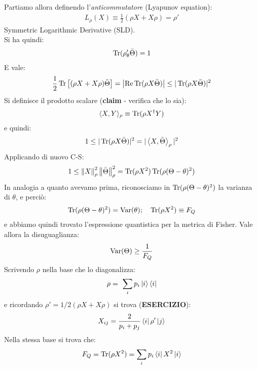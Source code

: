 \documentclass[../../InformazioneQuantistica.tex]{subfiles}
\begin{document}
Partiamo allora definendo l'\textit{anticommutatore} (Lyapunov equation):
\begin{align*}
L_\rho(X) \equiv \frac{1}{2}(\rho X + X\rho) = \rho'
\end{align*}
Symmetric Logarithmic Derivative (SLD).\\
Si ha quindi:
\begin{align*}
\operatorname{Tr}(\rho_\theta' \bar{\Theta} ) = 1
\end{align*}
E vale:
\begin{align*}
\frac{1}{2}\operatorname{Tr}\left[ (\rho X + X \rho) \bar{\Theta} \right]  = \left| \operatorname{Re}\operatorname{Tr}(\rho X \bar{\Theta} ) \right| \leq |\operatorname{Tr}(\rho X \bar{\Theta})|^2 
\end{align*}
Si definisce il prodotto scalare (\textbf{claim} - verifica che lo sia):
\begin{align*}
\langle X, Y \rangle_\rho \equiv \operatorname{Tr}(\rho X^\dag Y)
\end{align*}
e quindi:
\begin{align*}
1 \leq |\operatorname{Tr}(\rho X \bar{\Theta} ) |^2 = |\Braket{X,\bar{\Theta}}_\rho |^2 
\end{align*} 
Applicando di nuovo C-S:
\begin{align*}
1 \leq \left\lVert X\right\rVert^2_\rho \left\lVert\bar{\Theta}\right\rVert_\rho^2 = \operatorname{Tr}(\rho X^2 ) \operatorname{Tr}(\rho (\Theta-\theta)^2 )
\end{align*}
In analogia a quanto avevamo prima, riconosciamo in $\operatorname{Tr}(\rho(\Theta-\theta)^2)$ la varianza di $\theta$, e perciò:
\begin{align*}
\operatorname{Tr}(\rho(\Theta-\theta)^2) = \operatorname{Var}(\theta); \quad \operatorname{Tr}(\rho X^2) \equiv F_Q
\end{align*}
e abbiamo quindi trovato l'espressione quantistica per la metrica di Fisher. Vale allora la disuguaglianza:
\begin{align*}
\operatorname{Var}(\Theta) \geq \frac{1}{F_Q}
\end{align*}
Scrivendo $\rho$ nella base che lo diagonalizza:
\begin{align*}
\rho =\ \sum_i p_i \Ket{i}\Bra{i}
\end{align*}
e ricordando $\rho' = 1/2 (\rho X + X \rho)$ si trova (\textbf{ESERCIZIO}):
\begin{align*}
X_{ij} = \frac{2}{p_i + p_j} \Bra{i}\rho'\Ket{j}
\end{align*}
Nella stessa base si trova che:
\begin{align*}
F_Q = \operatorname{Tr}(\rho X^2) = \sum_i p_i \Bra{i}X^2 \Ket{i} 
\end{align*}
\end{document}
